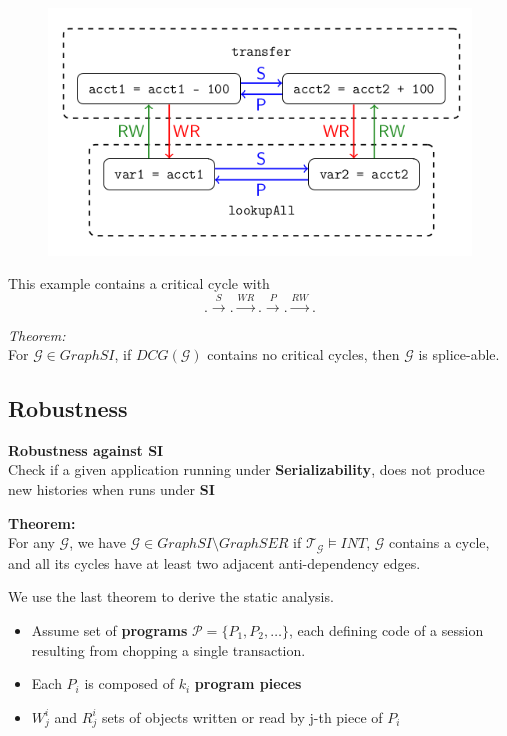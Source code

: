 \documentclass{beamer}
\begin{document}
\begin{frame}
\begin{figure}
	\includegraphics[scale=0.35]{fig5a}
\end{figure}
This example contains a critical cycle with $$.\xrightarrow{S}.\xrightarrow{WR}.\xrightarrow{P}.\xrightarrow{RW}.$$
\end{frame}


\begin{frame}
	\textit{Theorem:} \\
	For $\mathcal{G} \in GraphSI$, if $DCG(\mathcal{G})$ contains no critical cycles, then $\mathcal{G}$ is splice-able.
\end{frame}

\subsection{Robustness}

\begin{frame}
	\textbf{Robustness against SI} \\
	Check if a given application running under \textbf{Serializability}, does not produce new histories when runs under \textbf{SI}
\end{frame}


\begin{frame}
\textbf{Theorem:} \\
For any $\mathcal{G}$, we have $\mathcal{G} \in GraphSI \setminus GraphSER $ if $\mathcal{T}_\mathcal{G} \vDash INT$, $\mathcal{G}$ contains a cycle, and all its cycles have at least two adjacent anti-dependency edges.
\end{frame}

\begin{frame}
	We use the last theorem to derive the static analysis.
	\begin{itemize}
		\item Assume set of \textbf{programs} $\mathcal{P}=\{P_1, P_2, \dots\}$, each defining code of a session resulting from chopping a single transaction.
		\item Each $P_i$ is composed of $k_i$ \textbf{program pieces}
		\item $W^i_j$ and $R^i_j$ sets of objects written or read by j-th piece of $P_i$ 
	\end{itemize}
\end{frame}
\end{document}
